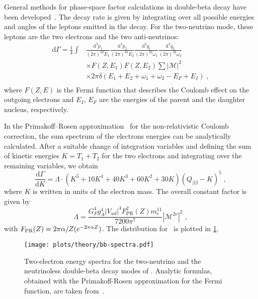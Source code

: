 General methods for phase-space factor calculations in double-beta decay have
been developed~\cite{Doi1981,Doi1983,Tomoda1991}. The decay rate is given by
integrating over all possible energies and angles of the leptons emitted in the
decay. For the two-neutrino mode, these leptons are the two electrons and the
two anti-neutrinos:
\[
  \begin{split}
    \text{d}\Gamma = \frac{1}{4} \int & \frac{\text{d}^3p_1}{(2\pi)^32E_1}
                                        \frac{\text{d}^3p_2}{(2\pi)^32E_2}
                                        \frac{\text{d}^3q_1}{(2\pi)^32\omega_1}
                                        \frac{\text{d}^3q_2}{(2\pi)^32\omega_2} \\
                                      & \times F(Z,E_1) F(Z,E_2) \sum |\mathcal{M}|^2 \\
                                      & \times 2\pi\delta (E_1 + E_2 + \omega_1 +
                                        \omega_2 - E_F + E_I) \;, \\
  \end{split}
\]
where $F(Z,E)$ is the Fermi function that describes the Coulomb effect on the
outgoing electrons and $E_I$, $E_F$ are the energies of the parent and the
daughter nucleus, respectively.

In the Primakoff–Rosen approximation~\cite{Primakoff1959} for the
non-relativistic Coulomb correction, the sum spectrum of the electrons energies
can be analytically calculated. After a suitable change of integration
variables and defining the sum of kinetic energies $K=T_1+T_2$ for the two
electrons and integrating over the remaining variables, we obtain
\begin{equation}\label{eq:nbb:stdmodel}
  \frac{\text{d}\Gamma}{\text{d}K} = \Lambda \cdot (K^5+10K^4+40K^3+60K^2+30K)
                                     (Q_{\beta\beta}-K)^5 \;,
\end{equation}
where $K$ is written in units of the electron mass. The overall constant factor
is given by
\[
  \Lambda = \frac{G_F^4g_A^4|V_{ud}|^4F^2_\text{PR}(Z)m_e^{11}}{7200\pi^7}
            |\mathcal{M}^{2\nu}|^2 \;,
\]
with $F_\text{PR}(Z) = 2\pi\alpha/Z(\-e^{-2\pi\alpha Z})$. The distribution for
\gesix\ is plotted in \cref{fig:nbb:spectra}.

\begin{figure}
  \centering
  \texttt{[image: plots/theory/bb-spectra.pdf]}
  \caption{%
    Two-electron energy spectra for the two-neutrino and the neutrinoless
    double-beta decay modes of \gesix. Analytic formulas, obtained with the
    Primakoff-Rosen approximation for the Fermi function, are taken
    from~\cite{Tretyak1995, Tretyak2002}.
  }\label{fig:nbb:spectra}
\end{figure}

